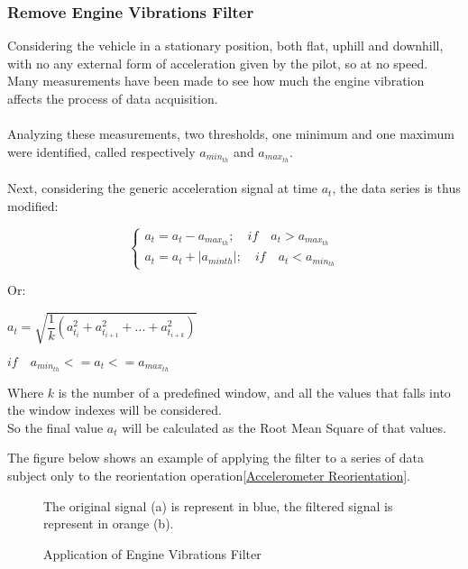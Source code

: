 \documentclass{standalone}
\begin{document}
\subsubsection{Remove Engine Vibrations Filter} \label{Remove Engine Vibrations Filter}
Considering the vehicle in a stationary position, both flat, uphill and downhill, with no any external form of acceleration given by the pilot, so at no speed. Many measurements have been made to see how much the engine vibration affects the process of data acquisition.\\\\
Analyzing these measurements, two thresholds, one minimum and one maximum were identified, called respectively \textbf{$a_{min_{th}}$} and \textbf{$a_{max_{th}}$}.\\\\
Next, considering the generic acceleration signal at time $a_{t}$, the data series is thus modified:


\begin{center}
\[
    \left\{
                \begin{array}{ll}
                  a_{t} = a_{t} - a_{max_{th}}; \quad 	if \quad a_{t} > a_{max_{th}}\\
              	  a_{t} = a_{t} + |a_{min{th}}|; \quad  if \quad a_{t} < a_{min_{th}}
                \end{array}
              \right.
\]
\end{center}
\clearpage
\noindent Or:

\begin{center}
$a_{t} = \sqrt{\dfrac{1}{k} (a_{t_{i}}^{2} + a_{t_{i+1}}^{2} + ... + a_{t_{i+k}}^{2} )} $\\
\end{center}
\begin{center}
$if\quad  a_{min_{th}} <= a_{t} <= a_{max_{th}} $


Where $k$ is the number of a predefined window, and all the values that falls into the window indexes will be considered.\\ 
So the final value $a_{t}$ will be calculated as the Root Mean Square of that values.
\end{center}

\noindent The figure below shows an example of applying the filter to a series of data subject only to the reorientation operation\ref{Accelerometer Reorientation}.

\begin{figure}[H]	


\centering
{}

The original signal (a) is represent in blue, the filtered signal is represent in orange (b).
 \caption{Application of Engine Vibrations Filter}
  \label{fig:Application of Engine Vibrations Filter.}
\end{figure}
\end{document}
